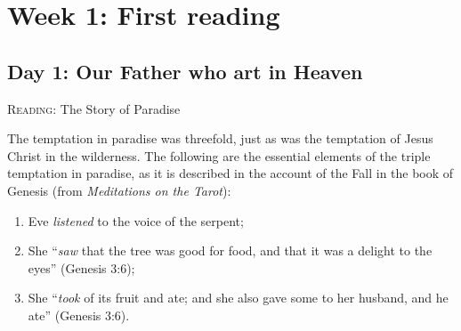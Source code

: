 \chapter{Week 1: First reading}

\section{Day 1: Our Father who art in Heaven}
\textsc{Reading}: The Story of Paradise

The temptation in paradise was threefold, just as was the temptation of Jesus Christ in the wilderness. The following
are the essential elements of the triple temptation in paradise, as it is described in the account of the Fall in the
book of Genesis (from \emph{Meditations on the Tarot}):

\begin{enumerate}
\item Eve \emph{listened} to the voice of the serpent; 
\item She ``\emph{saw} that the tree was good for food, and that it was a delight to the eyes'' (Genesis 3:6); 
\item She ``\emph{took} of its fruit and ate; and she also gave some to her husband, and he ate'' (Genesis 3:6). 
\end{enumerate}

